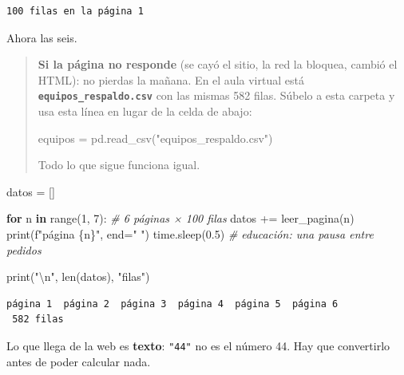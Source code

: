 \documentclass[
]{article}
\newenvironment{Shaded}{}{}
\newcommand{\BuiltInTok}[1]{\textcolor[rgb]{0.00,0.50,0.00}{#1}}
\newcommand{\CharTok}[1]{\textcolor[rgb]{0.25,0.44,0.63}{#1}}
\newcommand{\CommentTok}[1]{\textcolor[rgb]{0.38,0.63,0.69}{\textit{#1}}}
\newcommand{\ControlFlowTok}[1]{\textcolor[rgb]{0.00,0.44,0.13}{\textbf{#1}}}
\newcommand{\DecValTok}[1]{\textcolor[rgb]{0.25,0.63,0.44}{#1}}
\newcommand{\FloatTok}[1]{\textcolor[rgb]{0.25,0.63,0.44}{#1}}
\newcommand{\KeywordTok}[1]{\textcolor[rgb]{0.00,0.44,0.13}{\textbf{#1}}}
\newcommand{\NormalTok}[1]{#1}
\newcommand{\OperatorTok}[1]{\textcolor[rgb]{0.40,0.40,0.40}{#1}}
\newcommand{\SpecialCharTok}[1]{\textcolor[rgb]{0.25,0.44,0.63}{#1}}
\newcommand{\SpecialStringTok}[1]{\textcolor[rgb]{0.73,0.40,0.53}{#1}}
\newcommand{\StringTok}[1]{\textcolor[rgb]{0.25,0.44,0.63}{#1}}
\begin{document}
\begin{verbatim}
100 filas en la página 1
\end{verbatim}

\protect{}\label{XT2pqa_fnYyG}
Ahora las seis.

\begin{quote}
\textbf{Si la página no responde} (se cayó el sitio, la red la bloquea,
cambió el HTML): no pierdas la mañana. En el aula virtual está
\textbf{\texttt{equipos\_respaldo.csv}} con las mismas 582 filas. Súbelo
a esta carpeta y usa esta línea en lugar de la celda de abajo:

\begin{Shaded}
\begin{Highlighting}[]
\NormalTok{equipos }\OperatorTok{=}\NormalTok{ pd.read\_csv(}\StringTok{"equipos\_respaldo.csv"}\NormalTok{)}
\end{Highlighting}
\end{Shaded}

Todo lo que sigue funciona igual.
\end{quote}

\protect{}\label{2_JbUPbMnYyH}
\begin{Shaded}
\begin{Highlighting}[]
\NormalTok{datos }\OperatorTok{=}\NormalTok{ []}

\ControlFlowTok{for}\NormalTok{ n }\KeywordTok{in} \BuiltInTok{range}\NormalTok{(}\DecValTok{1}\NormalTok{, }\DecValTok{7}\NormalTok{):            }\CommentTok{\# 6 páginas × 100 filas}
\NormalTok{    datos }\OperatorTok{+=}\NormalTok{ leer\_pagina(n)}
    \BuiltInTok{print}\NormalTok{(}\SpecialStringTok{f"página }\SpecialCharTok{\{}\NormalTok{n}\SpecialCharTok{\}}\SpecialStringTok{"}\NormalTok{, end}\OperatorTok{=}\StringTok{"  "}\NormalTok{)}
\NormalTok{    time.sleep(}\FloatTok{0.5}\NormalTok{)              }\CommentTok{\# educación: una pausa entre pedidos}

\BuiltInTok{print}\NormalTok{(}\StringTok{"}\CharTok{\textbackslash{}n}\StringTok{"}\NormalTok{, }\BuiltInTok{len}\NormalTok{(datos), }\StringTok{"filas"}\NormalTok{)}
\end{Highlighting}
\end{Shaded}

\begin{verbatim}
página 1  página 2  página 3  página 4  página 5  página 6  
 582 filas
\end{verbatim}

\protect{}\label{CstpQk21nYyI}
Lo que llega de la web es \textbf{texto}: \texttt{"44"} no es el número
44. Hay que convertirlo antes de poder calcular nada.
\end{document}
